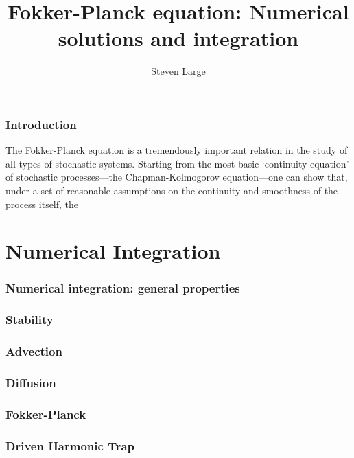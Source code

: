 \documentclass[15pt]{article}
\title{\sf Fokker-Planck equation: Numerical solutions and integration}
\author{\sf Steven Large}
\begin{document}
\maketitle
\tableofcontents
\pagebreak

\section{Introduction}

The Fokker-Planck equation is a tremendously important relation in the study of all types of stochastic systems. Starting from the most basic `continuity equation' of stochastic processes---the Chapman-Kolmogorov equation---one can show that, under a set of reasonable assumptions on the continuity and smoothness of the process itself, the 

\part{Numerical Integration}

    \section{Numerical integration: general properties}

    \section{Stability}

    \section{Advection}

    \section{Diffusion}

    \section{Fokker-Planck}


    \section{Driven Harmonic Trap}
\end{document}
